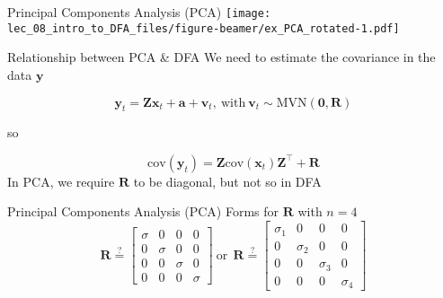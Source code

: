 \documentclass[
  ignorenonframetext,
]{beamer}
\begin{document}
\begin{frame}{Principal Components Analysis (PCA)}
\protect\hypertarget{principal-components-analysis-pca-3}{}
\texttt{[image: lec\_08\_intro\_to\_DFA\_files/figure-beamer/ex\_PCA\_rotated-1.pdf]}
\end{frame}

\begin{frame}{Relationship between PCA \& DFA}
\protect\hypertarget{relationship-between-pca-dfa}{}
We need to estimate the covariance in the data \(\mathbf{y}\)

\[
\mathbf{y}_t = \mathbf{Z} \mathbf{x}_t + \mathbf{a} + \mathbf{v}_t, ~ \text{with} ~ \mathbf{v}_t \sim \text{MVN}(\mathbf{0}, \mathbf{R})
\]

so

\[
\text{cov}(\mathbf{y}_t) = \mathbf{Z} \text{cov}(\mathbf{x}_t) \mathbf{Z}^\top + \mathbf{R}
\] In PCA, we require \(\mathbf{R}\) to be diagonal, but not so in DFA
\end{frame}

\begin{frame}{Principal Components Analysis (PCA) \textbar{} Forms for
\(\mathbf{R}\) with \(n = 4\)}
\protect\hypertarget{principal-components-analysis-pca-forms-for-mathbfr-with-n-4}{}
\[
\mathbf{R} \stackrel{?}{=}
\begin{bmatrix}
 \sigma & 0 & 0 & 0 \\
 0 & \sigma & 0 & 0 \\
 0 & 0 & \sigma & 0 \\
 0 & 0 & 0 & \sigma
\end{bmatrix}
~\text{or}~~
\mathbf{R} \stackrel{?}{=}
\begin{bmatrix}
 \sigma_1 & 0 & 0 & 0 \\
 0 & \sigma_2 & 0 & 0 \\
 0 & 0 & \sigma_3 & 0 \\
 0 & 0 & 0 & \sigma_4
\end{bmatrix}
\]
\end{frame}
\end{document}
